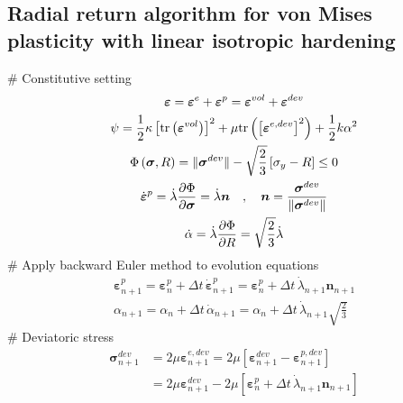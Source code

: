 \documentclass[]{scrartcl}
\begin{document}
\subsection{Radial return algorithm for von Mises plasticity with linear isotropic hardening}
\begin{easylist}
# Constitutive setting
\begin{gather*}
\boldsymbol{\varepsilon}
  = \boldsymbol{\varepsilon}^{e} + \boldsymbol{\varepsilon}^{p}
  = \boldsymbol{\varepsilon}^{vol} + \boldsymbol{\varepsilon}^{dev} 
\\
\psi
  = \frac{1}{2} \kappa \left[ \textnormal{tr} \left( \boldsymbol{\varepsilon}^{vol} \right) \right]^{2}
  + \mu \textnormal{tr} \left( \left[\boldsymbol{\varepsilon}^{e, dev} \right]^{2} \right)
  + \frac{1}{2} k  \alpha^{2} 
\\
\Phi \left( \boldsymbol{\sigma}, R \right)
  = \Vert \boldsymbol{\sigma}^{dev} \Vert - \sqrt{\frac{2}{3}} \left[ \sigma_{y} - R \right]
    \leq 0
\\
\dot{\boldsymbol{\varepsilon}}^{p} 
  = \dot{\lambda} \frac{\partial \Phi}{\partial \boldsymbol{\sigma}}
  = \dot{\lambda} \boldsymbol{n}
\quad , \quad
\boldsymbol{n}
  = \dfrac{\boldsymbol{\sigma}^{dev}}{\Vert \boldsymbol{\sigma}^{dev} \Vert}
\\
\dot{\alpha} 
  = \dot{\lambda} \frac{\partial \Phi}{\partial R}
  = \sqrt{\frac{2}{3}} \dot{\lambda}
\end{gather*}
# Apply backward Euler method to evolution equations
\begin{gather*}
\boldsymbol{\varepsilon}^{p}_{n+1}
  = \boldsymbol{\varepsilon}^{p}_{n}
  + \Delta t \, \dot{\boldsymbol{\varepsilon}}^{p}_{n+1}
  = \boldsymbol{\varepsilon}^{p}_{n}
  + \Delta t \, \dot{\lambda}_{n+1} \boldsymbol{n}_{n+1}
\\ 
\alpha_{n+1}
  = \alpha_{n}
  + \Delta t \, \dot{\alpha}_{n+1}
  = \alpha_{n}
  + \Delta t \, \dot{\lambda}_{n+1} \sqrt{\frac{2}{3}}
\end{gather*}
# Deviatoric stress
\begin{align*}
\boldsymbol{\sigma}^{dev}_{n+1}
 & = 2 \mu \boldsymbol{\varepsilon}^{e, dev}_{n+1}
  = 2 \mu \left[ \boldsymbol{\varepsilon}^{dev}_{n+1} - \boldsymbol{\varepsilon}^{p, dev}_{n+1} \right] \\
 &= 2 \mu  \boldsymbol{\varepsilon}^{dev}_{n+1} 
  - 2 \mu \left[ \boldsymbol{\varepsilon}^{p}_{n}
  + \Delta t \, \dot{\lambda}_{n+1} \boldsymbol{n}_{n+1} \right] \\

\end{align*}
\end{easylist}
\end{document}

